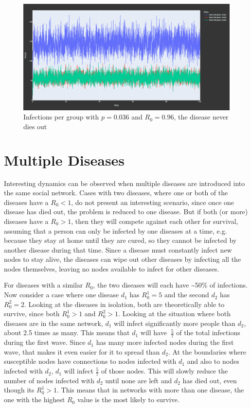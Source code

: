 \begin{figure}
    \centering
    \includegraphics[width=0.5\linewidth]{images/exp_subgroups.png}
    \caption{Infections per group with $p = 0.036$ and $R_0 = 0.96$, the disease never dies out}
    \label{fig:exp_subgroups}
\end{figure}


\section{Multiple Diseases}
Interesting dynamics can be observed when multiple diseases are introduced into the same social network. Cases with two diseases, where one or both of the diseases have a $R_0 < 1$, do not present an interesting scenario, since once one disease has died out, the problem is reduced to one disease. But if both (or more) diseases have a $R_0 > 1$, then they will compete against each other for survival, assuming that a person can only be infected by one diseases at a time, e.g. because they stay at home until they are cured, so they cannot be infected by another disease during that time. Since a disease must constantly infect new nodes to stay alive, the diseases can wipe out other diseases by infecting all the nodes themselves, leaving no nodes available to infect for other diseases.

For diseases with a similar $R_0$, the two diseases will each have \textasciitilde 50\% of infections. Now consider a case where one disease $d_1$ has $R_0^1=5$ and the second $d_2$ has $R_0^2=2$. Looking at the diseases in isolation, both are theoretically able to survive, since both $R_0^1 > 1$ and $R_0^2>1$. Looking at the situation where both diseases are in the same network, $d_1$ will infect significantly more people than $d_2$, about 2.5 times as many. This means that $d_1$ will have $~\frac{5}{7}$ of the total infections during the first wave. Since $d_1$ has many more infected nodes during the first wave, that makes it even easier for it to spread than $d_2$. At the boundaries where susceptible nodes have connections to nodes infected with $d_1$ and also to nodes infected with $d_2$, $d_1$ will infect $\frac{5}{7}$ of those nodes. This will slowly reduce the number of nodes infected with $d_2$ until none are left and $d_2$ has died out, even though its $R_0^1>1$. This means that in networks with more than one disease, the one  with the highest $R_0$ value is the most likely to survive.

